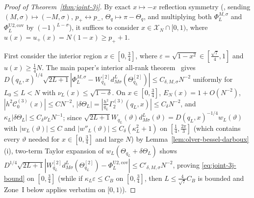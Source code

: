 \documentclass[11pt]{article}
\theoremstyle{definition}
\theoremstyle{remark}
\newcommand{\cC}{\mathcal{C}}
\newcommand{\cX}{\mathcal{X}}
\renewcommand{\_}{\oldunderscore\penalty0\hskip0pt\relax}
\begin{document}
\begin{proof}[Proof of Theorem~\ref{thm:joint-3j}]
By exact $x\mapsto -x$ reflection symmetry (\cite[Eq.~(17)]{LewisFixedRank}, sending $(M,\sigma)\mapsto(-M,\sigma)$, $p_+\leftrightarrow p_-$,
  $\Theta_q\mapsto\pi-\Theta_q$, and multiplying both $\Phi_L^{M,\sigma}$ and $\Phi_L^{\mathrm{U2,cov}}$ by $(-1)^{L-\sigma}$), it
  suffices to consider $x\in\cX_N\cap[0,1)$, where $u(x)=u_+(x)=N(1-x)\ge p_++1$.

First consider the interior region $x\in[0,\frac34]$, where $\varepsilon=\sqrt{1-x^2}\in[\frac{\sqrt{7}}{4},1]$ and
  $u(x)\ge\frac14 N$. The main paper's interior all-rank theorem~\cite[Corollary~4.4]{LewisGrowingRank} gives
  $D(q_L,x)^{1/4}\sqrt{2L+1}|\Phi_L^{M,\sigma}-W_{q_L}^{[2]}d^L_{M\sigma}(\Theta_{q_L}^{[2]})|\le C_{\delta,M,\sigma}N^{-2}$
  uniformly for $L_0\le L<N$ with $\nu_L(x)\le\sqrt{1-\delta}$. On $x\in[0,\frac34]$, $E_N(x)=1+O(N^{-2})$,
  $|h^2\cC_0^{(3)}(x)|\le CN^{-2}$, $|\delta\Theta_L|=|\frac{h^2}{q_L}\Gamma_2^{(3)}(q_L,x)|\le C_\delta N^{-2}$, and
  $\kappa_L|\delta\Theta_L|\le C_\delta\nu_L N^{-1}$; since
  $\sqrt{2L+1}W_{q_L}(\vartheta)d^L_{M\sigma}(\vartheta)=D(q_L,x)^{-1/4}w_L(\vartheta)$ with $|w_L(\vartheta)|\le C$ and
  $|w''_L(\vartheta)|\le C_\delta(\kappa_L^2+1)$ on $[\frac14,\frac{2\pi}{3}]$ (which contains every $\vartheta$ needed for $x\in[0,\frac34]$ and large $N$) by Lemma~\ref{lem:olver-bessel-darboux}(i),
  two-term Taylor expansion of $w_L(\Theta_{q_L}+\delta\Theta_L)$ shows
  $D^{1/4}\sqrt{2L+1}|W_{q_L}^{[2]}d^L_{M\sigma}(\Theta_{q_L}^{[2]})-\Phi_L^{\mathrm{U2,cov}}|\le C'_{\delta,M,\sigma}N^{-2}$,
  proving \eqref{eq:joint-3j-bound} on $[0,\frac34]$ (while if $\kappa_L\varepsilon\le C_B$ on $[0,\frac34]$, then
  $L\le\frac{4}{\sqrt{7}}C_B$ is bounded and Zone~I below applies verbatim on $[0,1)$).


\end{proof}
\end{document}
